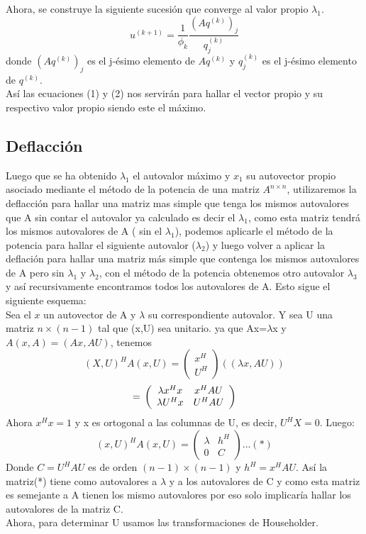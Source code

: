\documentclass[12pt,a4paper]{article}
\begin{document}
\begin{multicols}{2}
\begin{itemize}
\end{itemize}
Ahora, se construye la siguiente sucesión que converge al valor propio $\lambda_{1}$.
\begin{equation}\label{eigenvalue_iter}
u^{(k+1)} = \frac{1}{\phi_{k}}\frac{(Aq^{(k)})_{j}}{q^{(k)}_{j}}
\end{equation}
donde $(Aq^{(k)})_{j}$ es el j-ésimo elemento de $Aq^{(k)}$ y $q^{(k)}_{j}$ es el j-ésimo elemento de $q^{(k)}.$\\
Así las ecuaciones (1) y (2) nos servirán para hallar el vector propio y su respectivo valor propio siendo este el máximo.


\subsection{Deflacción}
\noindent Luego que se ha obtenido $\lambda_{1}$ el autovalor máximo y $x_{1}$ su autovector propio asociado mediante el método de la potencia de una matriz $A^{n\times n}$, utilizaremos la deflacción para hallar una matriz mas simple que tenga los mismos autovalores que A sin contar el autovalor ya calculado es decir el $\lambda_{1}$, como esta matriz tendrá los mismos autovalores de A ( sin el $\lambda_{1}$), podemos aplicarle el método de la potencia para hallar el siguiente autovalor ($\lambda_{2}$) y luego volver a aplicar la deflación para hallar una matriz más simple que contenga los mismos autovalores de A pero sin $\lambda_{1}$ y $\lambda_{2}$, con el método de la potencia obtenemos otro autovalor $\lambda_{3}$ y así recursivamente encontramos todos los autovalores de A.
Esto sigue el siguiente esquema:\\
Sea el $x$ un autovector de A y $\lambda $ su correspondiente autovalor. Y sea U una matriz $n\times(n-1)$ tal que (x,U) sea unitario. ya que Ax=$\lambda$x y $A(x,A)=(Ax,AU)$, tenemos$$(X,U)^{H}A(x,U)=\left(\begin{array}{c}
    x^{H} \\
     U^{H} 
\end{array}\right)\left((\lambda x,AU)\right)$$ $$=\newline \left(\begin{array}{cc}
   \lambda x^{H}x  &  x^{H}AU\\
   \lambda U^{H}x  & U^{H}AU
\end{array}\right)$$
Ahora $x^{H}x=1$  y x es ortogonal a las columnas de U, es decir, $U^{H}X=0$. Luego:\\
$$(x,U)^{H}A(x,U)=\left(\begin{array}{cc}
  \lambda   &  h^{H}\\
    0 & C
\end{array}\right)...(*)$$ Donde $C=U^{H}AU$ es de orden  $(n-1)\times (n-1)$ y $h^{H}=x^{H}AU$. Así la matriz(*) tiene como autovalores a $\lambda$ y a los autovalores de C y como esta matriz es semejante a A tienen los mismo autovalores por eso solo implicaría hallar los autovalores de la matriz C.\\
Ahora, para determinar U usamos las transformaciones de Householder.\\


\end{multicols}
\end{document}
